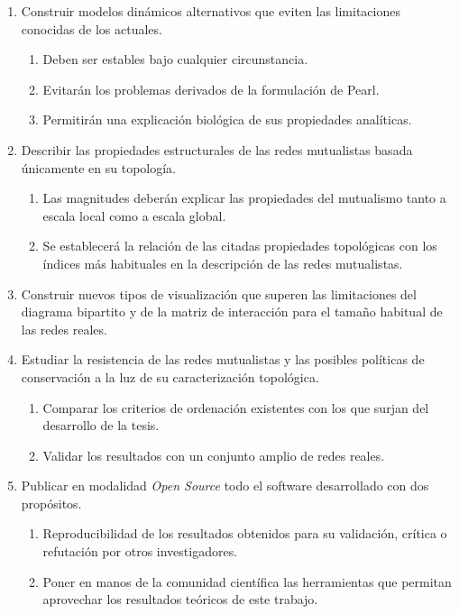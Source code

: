 \begin{enumerate}
\item Construir modelos dinámicos alternativos que eviten las limitaciones conocidas de los actuales.
   \begin{enumerate}
		\item Deben ser estables bajo cualquier circunstancia.
		\item Evitarán los problemas derivados de la formulación de Pearl.
		\item Permitirán una explicación biológica de sus propiedades analíticas.
   \end{enumerate}
   
\item Describir las propiedades estructurales de las redes mutualistas basada únicamente en su topología.
		\begin{enumerate}
		\item Las magnitudes deberán explicar las propiedades del mutualismo tanto a escala local como a escala global.
		\item Se establecerá la relación de las citadas propiedades topológicas con los índices más habituales en la descripción de las redes mutualistas.
		\end{enumerate}
		
\item Construir nuevos tipos de visualización que superen las limitaciones del diagrama bipartito y de la matriz de interacción para el tamaño habitual de las redes reales.

\item Estudiar la resistencia de las redes mutualistas y las posibles políticas de conservación a la luz de su caracterización topológica.
\begin{enumerate}
		\item Comparar los criterios de ordenación existentes con los que surjan del desarrollo de la tesis.
		\item Validar los resultados con un conjunto amplio de redes reales.
		\end{enumerate}
		
\item Publicar en modalidad \textit{Open Source} todo el software desarrollado con dos propósitos.
 \begin{enumerate}
		\item Reproducibilidad de los resultados obtenidos para su validación, crítica o refutación por otros investigadores.
		\item Poner en manos de la comunidad científica las herramientas que permitan aprovechar los resultados teóricos de este trabajo.
		\end{enumerate}
\end{enumerate}


